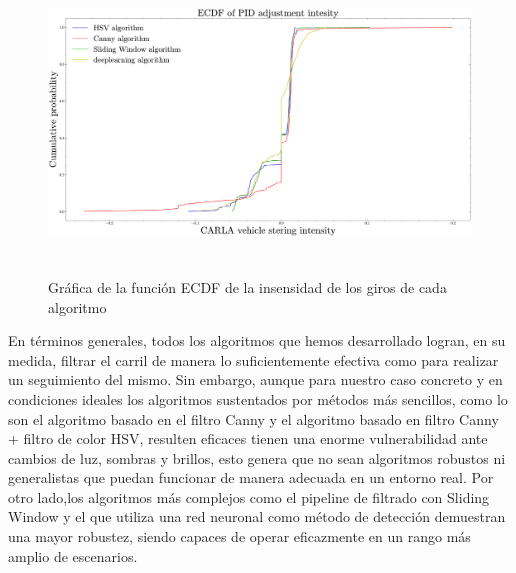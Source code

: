 \begin{figure}[t]
    \centering
    \includegraphics[height=8cm]{imagenes/cap4/graphics_comparison/ECDF.pdf}
    \caption{Gráfica de la función ECDF de la insensidad de los giros de cada algoritmo}
    \label{fig:Gráfica de la función ECDF de la insensidad de los giros de cada algoritmo}
\end{figure}


\bigskip

En términos generales, todos los algoritmos que hemos desarrollado logran, en su medida, filtrar el carril de manera lo suficientemente efectiva como para realizar un seguimiento del mismo. Sin embargo, aunque para nuestro caso concreto y en condiciones ideales los algoritmos sustentados por métodos más sencillos, como lo son el algoritmo basado en el filtro Canny y el algoritmo basado en filtro Canny + filtro de color HSV, resulten eficaces tienen una enorme vulnerabilidad ante cambios de luz, sombras y brillos, esto genera que no sean algoritmos robustos ni generalistas que puedan funcionar de manera adecuada en un entorno real. Por otro lado,los algoritmos más complejos como el pipeline de filtrado con Sliding Window y el que utiliza una red neuronal como método de detección demuestran una mayor robustez, siendo capaces de operar eficazmente en un rango más amplio de escenarios. 

\bigskip

